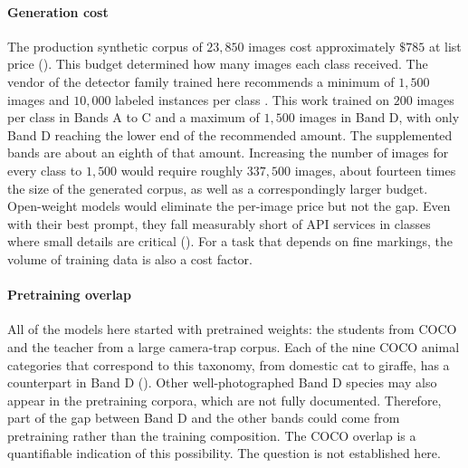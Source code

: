 \paragraph{Generation cost}
The production synthetic corpus of $23{,}850$ images cost approximately $\$785$ at list price (). This budget determined how many images each class received. The vendor of the detector family trained here recommends a minimum of $1{,}500$ images and $10{,}000$ labeled instances per class \cite{TipsBestYOLOv52026}. This work trained on $200$ images per class in Bands A to C and a maximum of $1{,}500$ images in Band D, with only Band D reaching the lower end of the recommended amount. The supplemented bands are about an eighth of that amount. Increasing the number of images for every class to $1{,}500$ would require roughly $337{,}500$ images, about fourteen times the size of the generated corpus, as well as a correspondingly larger budget.  %
Open-weight models would eliminate the per-image price but not the gap. Even with their best prompt, they fall measurably short of API services in classes where small details are critical (). For a task that depends on fine markings, the volume of training data is also a cost factor.

\paragraph{Pretraining overlap}
All of the models here started with pretrained weights: the students from COCO and the teacher from a large camera-trap corpus. Each of the nine COCO animal categories that correspond to this taxonomy, from domestic cat to giraffe, has a counterpart in Band D (). Other well-photographed Band D species may also appear in the pretraining corpora, which are not fully documented. Therefore, part of the gap between Band D and the other bands could come from pretraining rather than the training composition. The COCO overlap is a quantifiable indication of this possibility. The question is not established here.

